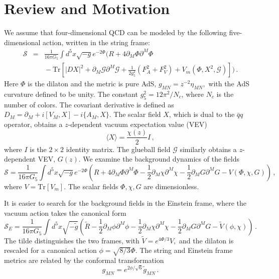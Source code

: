 \documentclass[aps,prd,12pt,nofootinbib]{revtex4}
\newcommand{\be}{\begin{equation}}
\newcommand{\ee}{\end{equation}}
\newcommand{\ba}{\begin{eqnarray}}
\newcommand{\ea}{\end{eqnarray}}
\def\thalf{{\textstyle{\frac{1}{2}}}}
\newcommand{\cS}{\mathcal S}
\begin{document}
\section{Review and Motivation}
\label{secReview}

We assume that four-dimensional QCD can be modeled by the following five-dimensional action, written in the string frame:
\ba
\cS &=&\frac{1}{16\pi G_5} \int d^5x \sqrt{-g} e^{-2\Phi}  \Bigg( R+4\partial_M\Phi\partial^M\Phi \nonumber \\ 
& & \mbox{} - \mathrm{Tr} \left[ |DX|^2  +\partial_M \mathcal{G} \partial^M \mathcal{G} + \frac{1}{2g_5^2} (F_A^2+F_V^2) +V_m(\Phi,X^2, \mathcal{G}) \right]\Bigg) \, .
\label{eqStringAction}
\ea
Here $\Phi$ is the dilaton and the metric is pure AdS, $g_{MN}=z^{-2}\eta_{MN},$ with the AdS curvature defined to be unity.
The constant $g_5^2 = 12\pi^2/N_c$, where $N_c$ is the number of colors.
The covariant derivative is defined as $D_M = \partial_M+i[V_M,X]-i\{A_M,X\}$.
The scalar field $X$, which is dual to the $\bar{q}q$ operator, obtains a $z$-dependent vacuum expectation value (VEV)
\be
\langle X \rangle=\frac{\chi(z)}{2}I \, ,
\ee
where $I$ is the $2 \times 2$ identity matrix.
The glueball field $\mathcal{G}$ similarly obtains a $z$-dependent VEV, $G(z)$.
We examine the background dynamics of the fields
\be
\cS =\frac{1}{16\pi G_5} \int d^5x \sqrt{-g} e^{-2\Phi}  \left(R+4\partial_M\Phi\partial^M\Phi -\thalf\partial_M \chi \partial^M \chi -\thalf\partial_M G \partial^M G -V(\Phi,\chi,G) \right) \, ,
\ee
where $V=\mathrm{Tr}[V_m]$.
The scalar fields $\Phi,\chi,G$ are dimensionless. 

It is easier to search for the background fields in the Einstein frame, where the vacuum action takes the canonical form
\be
\cS_E=\frac{1}{16\pi G_5} \int d^5x \sqrt{-\tilde{g}}\left(\tilde{R}-\thalf\partial_M\phi\partial^M\phi -\thalf\partial_M\chi\partial^M\chi -\thalf\partial_M G \partial^M G - \tilde{V}(\phi,\chi)\right) \, .
\label{eq:Einstein}
\ee
The tilde distinguishes the two frames, with $\tilde{V}=e^{4\Phi/3}V,$ and the dilaton is rescaled for a canonical action $\phi=\sqrt{8/3}\Phi$.
The string and Einstein frame metrics are related by the conformal transformation
\be
g_{MN}=e^{2\phi/\sqrt{6}}\tilde{g}_{MN} \, .
\ee
\end{document}
